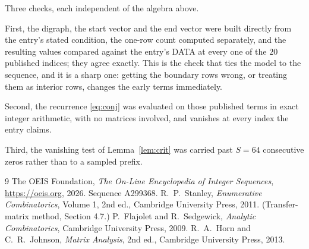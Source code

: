 \documentclass[11pt,a4paper]{article}
\theoremstyle{plain}
\theoremstyle{definition}
\begin{document}
Three checks, each independent of the algebra above.

First, the digraph, the start vector and the end vector were built directly from the
entry's stated condition, the one-row count computed separately, and the resulting values
compared against the entry's DATA at every one of the $20$ published indices; they
agree exactly. This is the check that ties the model to the sequence, and it is a sharp one:
getting the boundary rows wrong, or treating them as interior rows, changes the early terms
immediately.

Second, the recurrence \eqref{eq:conj} was evaluated on those published terms in exact
integer arithmetic, with no matrices involved, and vanishes at every index the entry claims.

Third, the vanishing test of Lemma~\ref{lem:crit} was carried past $S=64$ consecutive
zeros rather than to a sampled prefix.

\begin{thebibliography}{9}
 The OEIS Foundation, \emph{The On-Line Encyclopedia of Integer
Sequences}, \url{https://oeis.org}, 2026. Sequence A299368.
 R.~P.~Stanley, \emph{Enumerative Combinatorics}, Volume 1, 2nd ed.,
Cambridge University Press, 2011. (Transfer-matrix method, Section 4.7.)
 P.~Flajolet and R.~Sedgewick, \emph{Analytic Combinatorics}, Cambridge
University Press, 2009.
 R.~A.~Horn and C.~R.~Johnson, \emph{Matrix Analysis}, 2nd ed., Cambridge
University Press, 2013.
\end{thebibliography}
\end{document}
